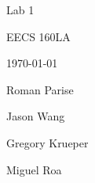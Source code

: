 \centering
\vspace*{5cm}
{\huge Lab 1 \par}
{\Large EECS 160LA \par}
{\Large \today \par}
\vspace{1cm}
{\large Roman Parise \par}
{\large Jason Wang \par}
{\large Gregory Krueper \par}
{\large Miguel Roa \par}
\vspace{1cm}
